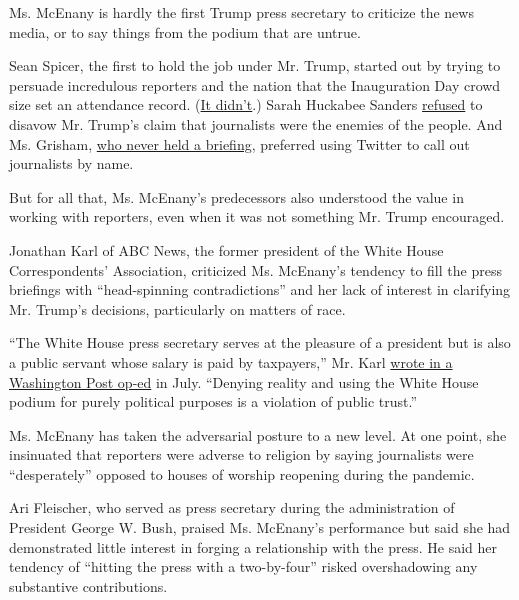 Ms. McEnany is hardly the first Trump press secretary to criticize the
news media, or to say things from the podium that are untrue.

Sean Spicer, the first to hold the job under Mr. Trump, started out by
trying to persuade incredulous reporters and the nation that the
Inauguration Day crowd size set an attendance record.
(\href{https://www.nytimes.com/2017/01/22/us/politics/president-trump-inauguration-crowd-white-house.html}{It
didn't}.) Sarah Huckabee Sanders
\href{https://www.theguardian.com/us-news/2018/aug/03/sanders-trump-acosta-media-enemy}{refused}
to disavow Mr. Trump's claim that journalists were the enemies of the
people. And Ms. Grisham,
\href{https://www.nytimes.com/2020/01/10/business/media/stephanie-grisham-trump-press-secretary.html}{who
never held a briefing}, preferred using Twitter to call out journalists
by name.

But for all that, Ms. McEnany's predecessors also understood the value
in working with reporters, even when it was not something Mr. Trump
encouraged.

Jonathan Karl of ABC News, the former president of the White House
Correspondents' Association, criticized Ms. McEnany's tendency to fill
the press briefings with ``head-spinning contradictions'' and her lack
of interest in clarifying Mr. Trump's decisions, particularly on matters
of race.

``The White House press secretary serves at the pleasure of a president
but is also a public servant whose salary is paid by taxpayers,'' Mr.
Karl
\href{https://www.washingtonpost.com/opinions/its-the-duty-of-the-white-house-press-secretary-to-hold-briefings-but-not-like-this/2020/07/10/1a61ae78-c2cc-11ea-b178-bb7b05b94af1_story.html}{wrote
in a Washington Post op-ed} in July. ``Denying reality and using the
White House podium for purely political purposes is a violation of
public trust.''

Ms. McEnany has taken the adversarial posture to a new level. At one
point, she insinuated that reporters were adverse to religion by saying
journalists were ``desperately'' opposed to houses of worship reopening
during the pandemic.

Ari Fleischer, who served as press secretary during the administration
of President George W. Bush, praised Ms. McEnany's performance but said
she had demonstrated little interest in forging a relationship with the
press. He said her tendency of ``hitting the press with a two-by-four''
risked overshadowing any substantive contributions.

